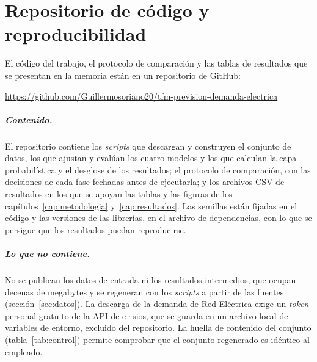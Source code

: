 \chapter{Repositorio de código y reproducibilidad}\label{anexo:repositorio}

El código del trabajo, el protocolo de comparación y las tablas de resultados
que se presentan en la memoria están en un repositorio de GitHub:

\begin{center}
	\url{https://github.com/Guillermosoriano20/tfm-prevision-demanda-electrica}
\end{center}

\paragraph{Contenido.} El repositorio contiene los \textit{scripts} que
descargan y construyen el conjunto de datos, los que ajustan y evalúan los
cuatro modelos y los que calculan la capa probabilística y el desglose de los
resultados; el protocolo de comparación, con las decisiones de cada fase
fechadas antes de ejecutarla; y los archivos CSV de resultados en los que se
apoyan las tablas y las figuras de los capítulos~\ref{cap:metodologia}
y~\ref{cap:resultados}. Las semillas están fijadas en el código y las versiones
de las librerías, en el archivo de dependencias, con lo que se persigue que los
resultados puedan reproducirse.

\paragraph{Lo que no contiene.} No se publican los datos de entrada ni los
resultados intermedios, que ocupan decenas de megabytes y se regeneran con los
\textit{scripts} a partir de las fuentes (sección~\ref{sec:datos}). La descarga
de la demanda de Red Eléctrica exige un \textit{token} personal gratuito
de la API de e·sios, que se guarda en un archivo local de variables de entorno,
excluido del repositorio. La huella de contenido del conjunto
(tabla~\ref{tab:control}) permite comprobar que el conjunto regenerado es
idéntico al empleado.

